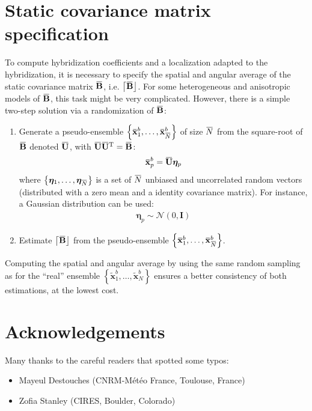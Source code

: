 \documentclass[12pt]{scrartcl}
\newcommand{\overbar}[1]{\mkern 1.5mu\overline{\mkern-1.5mu#1\mkern-1.5mu}\mkern 1.5mu}
\begin{document}
\clearpage

\section{Static covariance matrix specification}
To compute hybridization coefficients and a localization adapted to the hybridization, it is necessary to specify the spatial and angular average of the static covariance matrix $\overbar{\mathbf{B}}$, i.e. $\left\lceil \overbar{\mathbf{B}} \right\rfloor$. For some heterogeneous and anisotropic models of $\overbar{\mathbf{B}}$, this task might be very complicated. However, there is a simple two-step solution via a randomization of $\overbar{\mathbf{B}}$:
\begin{enumerate}
\item Generate a pseudo-ensemble $\left\{\overbar{\mathbf{x}}^b_1,\dots,\overbar{\mathbf{x}}^b_{\overbar{N}}\right\}$ of size $\overbar{N}$ from the square-root of $\overbar{\mathbf{B}}$ denoted $\overbar{\mathbf{U}}$, with $\overbar{\mathbf{U}} \overbar{\mathbf{U}}^\mathrm{T} = \overbar{\mathbf{B}}$:
\begin{align}
\overbar{\mathbf{x}}^b_p = \overbar{\mathbf{U}} \boldsymbol{\eta}_p
\end{align}
where $\left\{\boldsymbol{\eta}_1,\dots,\boldsymbol{\eta}_{\overbar{N}}\right\}$ is a set of $\overbar{N}$ unbiased and uncorrelated random vectors (distributed with a zero mean and a identity covariance matrix). For instance, a Gaussian distribution can be used:
\begin{align}
\boldsymbol{\eta}_p \sim \mathcal{N}\left(0,\mathbf{I}\right)
\end{align}
\item Estimate $\left\lceil \overbar{\mathbf{B}} \right\rfloor$ from the pseudo-ensemble $\left\{\overbar{\mathbf{x}}^b_1,\dots,\overbar{\mathbf{x}}^b_{\overbar{N}}\right\}$.
\end{enumerate}
Computing the spatial and angular average by using the same random sampling as for the ``real'' ensemble $\left\{\widetilde{\mathbf{x}}^b_1,\dots,\widetilde{\mathbf{x}}^b_N\right\}$ ensures a better consistency of both estimations, at the lowest cost.

\clearpage

\section*{Acknowledgements}
Many thanks to the careful readers that spotted some typos:
\begin{itemize}
\item Mayeul Destouches (CNRM-Météo France, Toulouse, France)
\item Zofia Stanley (CIRES, Boulder, Colorado)
\end{itemize}




\end{document}
